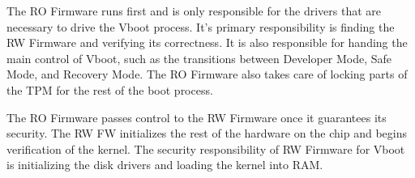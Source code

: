 \documentclass[../report.tex]{subfiles}
\begin{document}
The RO Firmware runs first and is only responsible for the drivers that are necessary to drive the Vboot process. 
It's primary responsibility is finding the RW Firmware and verifying its correctness. 
It is also responsible for handing the main control of Vboot, such as the transitions between Developer Mode, Safe Mode, and Recovery Mode.
The RO Firmware also takes care of locking parts of the TPM for the rest of the boot process.

The RO Firmware passes control to the RW Firmware once it guarantees its security.
The RW FW initializes the rest of the hardware on the chip and begins verification of the kernel.
The security responsibility of RW Firmware for Vboot is initializing the disk drivers and loading the kernel into RAM\@.
\end{document}
